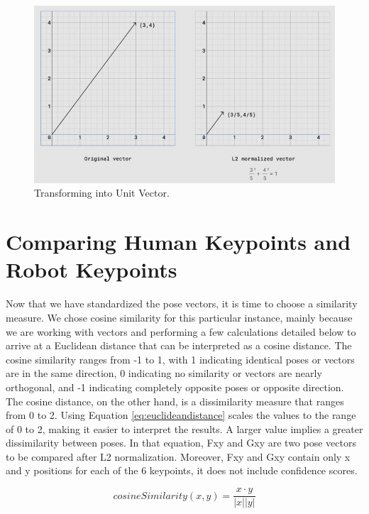 \begin{figure}[ht]
  \centering
  \includegraphics[scale=0.7]{gambar/transform-to-unit-vector.png}
  \caption{Transforming into Unit Vector.}
  \label{fig:transforming-into-unit-vector}
\end{figure}

\section{Comparing Human Keypoints and Robot Keypoints}
\label{sec:comparing-keypoints}

Now that we have standardized the pose vectors, it is time to choose a similarity measure. We chose cosine similarity for this particular instance, mainly because we are working with vectors and performing a few calculations detailed below to arrive at a Euclidean distance that can be interpreted as a cosine distance.
The cosine similarity ranges from -1 to 1, with 1 indicating identical poses or vectors are in the same direction, 0 indicating no similarity or vectors are nearly orthogonal, and -1 indicating completely opposite poses or opposite direction. The cosine distance, on the other hand, is a dissimilarity measure that ranges from 0 to 2.
Using Equation \ref{eq:euclideandistance} scales the values to the range of 0 to 2, making it easier to interpret the results. A larger value implies a greater dissimilarity between poses. In that equation, Fxy and Gxy are two pose vectors to be compared after L2 normalization. Moreover, Fxy and Gxy contain only x and y positions for each of the 6 keypoints, it does not include confidence scores.

\begin{equation}
  \label{eq:cosinesimilarity}
  cosineSimilarity(x,y) = \frac{x \cdot y}{|x||y|}
\end{equation}

